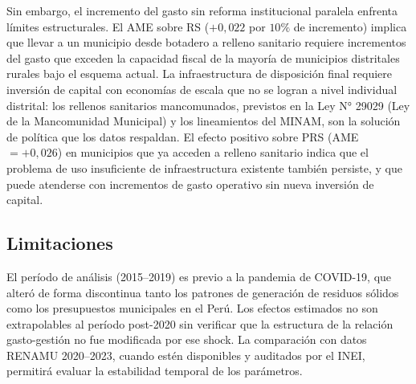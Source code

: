 Sin embargo, el incremento del gasto sin reforma institucional paralela enfrenta límites estructurales. El AME sobre RS ($+0{,}022$ por $10\%$ de incremento) implica que llevar a un municipio desde botadero a relleno sanitario requiere incrementos del gasto que exceden la capacidad fiscal de la mayoría de municipios distritales rurales bajo el esquema actual. La infraestructura de disposición final requiere inversión de capital con economías de escala que no se logran a nivel individual distrital: los rellenos sanitarios mancomunados, previstos en la Ley N° 29029 (Ley de la Mancomunidad Municipal) y los lineamientos del MINAM, son la solución de política que los datos respaldan. El efecto positivo sobre PRS (AME $= +0{,}026$) en municipios que ya acceden a relleno sanitario indica que el problema de uso insuficiente de infraestructura existente también persiste, y que puede atenderse con incrementos de gasto operativo sin nueva inversión de capital.

\subsection{Limitaciones}
\label{sec:limitaciones}

El período de análisis (2015--2019) es previo a la pandemia de COVID-19, que alteró de forma discontinua tanto los patrones de generación de residuos sólidos como los presupuestos municipales en el Perú. Los efectos estimados no son extrapolables al período post-2020 sin verificar que la estructura de la relación gasto-gestión no fue modificada por ese shock. La comparación con datos RENAMU 2020--2023, cuando estén disponibles y auditados por el INEI, permitirá evaluar la estabilidad temporal de los parámetros.

